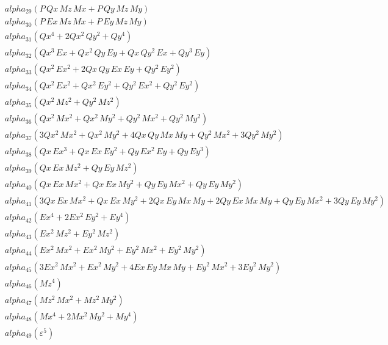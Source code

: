 \documentclass{article}
\begin{document}
\begin{align*}
  &\quad alpha_{29} \left(P\,Qx\,Mz\,Mx + P\,Qy\,Mz\,My\right) \\
  &\quad alpha_{30} \left(P\,Ex\,Mz\,Mx + P\,Ey\,Mz\,My\right) \\
  &\quad alpha_{31} \left(Qx^{4} + 2Qx^{2}\,Qy^{2} + Qy^{4}\right) \\
  &\quad alpha_{32} \left(Qx^{3}\,Ex + Qx^{2}\,Qy\,Ey + Qx\,Qy^{2}\,Ex + Qy^{3}\,Ey\right) \\
  &\quad alpha_{33} \left(Qx^{2}\,Ex^{2} + 2Qx\,Qy\,Ex\,Ey + Qy^{2}\,Ey^{2}\right) \\
  &\quad alpha_{34} \left(Qx^{2}\,Ex^{2} + Qx^{2}\,Ey^{2} + Qy^{2}\,Ex^{2} + Qy^{2}\,Ey^{2}\right) \\
  &\quad alpha_{35} \left(Qx^{2}\,Mz^{2} + Qy^{2}\,Mz^{2}\right) \\
  &\quad alpha_{36} \left(Qx^{2}\,Mx^{2} + Qx^{2}\,My^{2} + Qy^{2}\,Mx^{2} + Qy^{2}\,My^{2}\right) \\
  &\quad alpha_{37} \left(3Qx^{2}\,Mx^{2} + Qx^{2}\,My^{2} + 4Qx\,Qy\,Mx\,My + Qy^{2}\,Mx^{2} + 3Qy^{2}\,My^{2}\right) \\
  &\quad alpha_{38} \left(Qx\,Ex^{3} + Qx\,Ex\,Ey^{2} + Qy\,Ex^{2}\,Ey + Qy\,Ey^{3}\right) \\
  &\quad alpha_{39} \left(Qx\,Ex\,Mz^{2} + Qy\,Ey\,Mz^{2}\right) \\
  &\quad alpha_{40} \left(Qx\,Ex\,Mx^{2} + Qx\,Ex\,My^{2} + Qy\,Ey\,Mx^{2} + Qy\,Ey\,My^{2}\right) \\
  &\quad alpha_{41} \left(3Qx\,Ex\,Mx^{2} + Qx\,Ex\,My^{2} + 2Qx\,Ey\,Mx\,My + 2Qy\,Ex\,Mx\,My + Qy\,Ey\,Mx^{2} + 3Qy\,Ey\,My^{2}\right) \\
  &\quad alpha_{42} \left(Ex^{4} + 2Ex^{2}\,Ey^{2} + Ey^{4}\right) \\
  &\quad alpha_{43} \left(Ex^{2}\,Mz^{2} + Ey^{2}\,Mz^{2}\right) \\
  &\quad alpha_{44} \left(Ex^{2}\,Mx^{2} + Ex^{2}\,My^{2} + Ey^{2}\,Mx^{2} + Ey^{2}\,My^{2}\right) \\
  &\quad alpha_{45} \left(3Ex^{2}\,Mx^{2} + Ex^{2}\,My^{2} + 4Ex\,Ey\,Mx\,My + Ey^{2}\,Mx^{2} + 3Ey^{2}\,My^{2}\right) \\
  &\quad alpha_{46} \left(Mz^{4}\right) \\
  &\quad alpha_{47} \left(Mz^{2}\,Mx^{2} + Mz^{2}\,My^{2}\right) \\
  &\quad alpha_{48} \left(Mx^{4} + 2Mx^{2}\,My^{2} + My^{4}\right) \\
  &\quad alpha_{49} \left(ε^{5}\right) \\

\end{align*}
\end{document}
